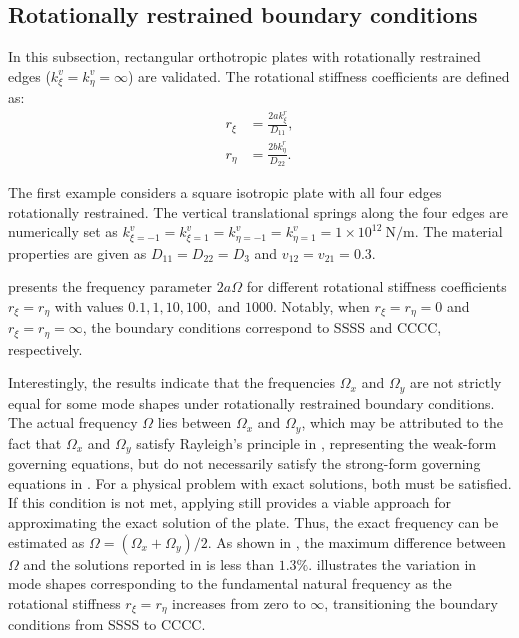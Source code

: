 \documentclass[preprint,12pt]{elsarticle}
\newcommand{\ustif}{~\unit{\newton\per\metre}\xspace}
\begin{document}
\subsection{Rotationally restrained boundary conditions}
In this subsection, rectangular orthotropic plates with rotationally restrained edges ($k^v_\xi = k^v_\eta = \infty$) are validated.  
The rotational stiffness coefficients are defined as: 
% 
\begin{subequations}\label{eq:rotation_coex}
	\begin{align}
		r_{\xi} &= \frac{2a k^r_{\xi}}{D_{11}}, \\
		r_{\eta} &= \frac{2b k^r_{\eta}}{D_{22}}.
	\end{align}
\end{subequations}


The first example considers a square isotropic plate with all four edges rotationally restrained. The vertical translational springs along the four edges are numerically set as $ k^v_{\xi=-1} = k^v_{\xi=1} = k^v_{\eta=-1} = k^v_{\eta=1} = 1 \times 10^{12} \ustif $. The material properties are given as $ D_{11} = D_{22} = D_3 $ and $ v_{12} = v_{21} = 0.3 $.  

 presents the frequency parameter $2a\Omega $ for different rotational stiffness coefficients  $ r_{\xi} = r_{\eta} $ with values $ 0.1, 1, 10, 100, $ and $ 1000$.  
Notably, when $ r_{\xi} = r_{\eta} = 0 $ and $r_{\xi} = r_{\eta} = \infty$, the boundary conditions correspond to SSSS and CCCC, respectively.  

Interestingly, the results indicate that the frequencies $\Omega_x$ and $\Omega_y$ are not strictly equal for some mode shapes under rotationally restrained boundary conditions.  
The actual frequency $\Omega$ lies between $\Omega_x$ and $\Omega_y$, which may be attributed to the fact that $\Omega_x$ and $\Omega_y$ satisfy Rayleigh’s principle in , representing the weak-form governing equations, but do not necessarily satisfy the strong-form governing equations in .
For a physical problem with exact solutions, both  must be satisfied.  
If this condition is not met, applying  still provides a viable approach for approximating the exact solution of the plate.  
Thus, the exact frequency can be estimated as $\Omega = (\Omega_x + \Omega_y)/2$.  
As shown in , the maximum difference between \(\Omega\) and the solutions reported in  is less than $1.3\%$.
 illustrates the variation in mode shapes corresponding to the fundamental natural frequency as the rotational stiffness $r_{\xi} = r_{\eta}$ increases from zero to $\infty$, transitioning the boundary conditions from SSSS to CCCC.
\end{document}
